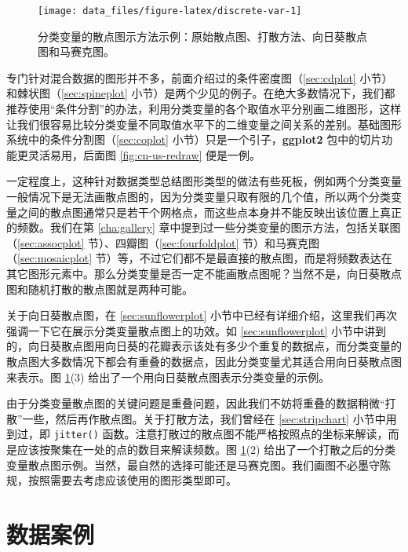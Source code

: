 \documentclass[
  b5paper,
  UTF8,twoside]{book}
\begin{document}
\begin{figure}

{\centering \texttt{[image: data\_files/figure-latex/discrete-var-1]} 

}

\caption[分类变量的散点图示方法示例]{分类变量的散点图示方法示例：原始散点图、打散方法、向日葵散点图和马赛克图。}\label{fig:discrete-var}
\end{figure}



专门针对混合数据的图形并不多，前面介绍过的条件密度图（\ref{sec:cdplot} 小节）和棘状图（\ref{sec:spineplot} 小节）是两个少见的例子。在绝大多数情况下，我们都推荐使用``条件分割''的办法，利用分类变量的各个取值水平分别画二维图形，这样让我们很容易比较分类变量不同取值水平下的二维变量之间关系的差别。基础图形系统中的条件分割图（\ref{sec:coplot} 小节）只是一个引子，\textbf{ggplot2} 包中的切片功能更灵活易用，后面图 \ref{fig:cn-us-redraw} 便是一例。

一定程度上，这种针对数据类型总结图形类型的做法有些死板，例如两个分类变量一般情况下是无法画散点图的，因为分类变量只取有限的几个值，所以两个分类变量之间的散点图通常只是若干个网格点，而这些点本身并不能反映出该位置上真正的频数。我们在第 \ref{cha:gallery} 章中提到过一些分类变量的图示方法，包括关联图（\ref{sec:assocplot} 节）、四瓣图（\ref{sec:fourfoldplot} 节）和马赛克图（\ref{sec:mosaicplot} 节）等，不过它们都不是最直接的散点图，而是将频数表达在其它图形元素中。那么分类变量是否一定不能画散点图呢？当然不是，向日葵散点图和随机打散的散点图就是两种可能。

关于向日葵散点图，在 \ref{sec:sunflowerplot} 小节中已经有详细介绍，这里我们再次强调一下它在展示分类变量散点图上的功效。如 \ref{sec:sunflowerplot} 小节中讲到的，向日葵散点图用向日葵的花瓣表示该处有多少个重复的数据点，而分类变量的散点图大多数情况下都会有重叠的数据点，因此分类变量尤其适合用向日葵散点图来表示。图 \ref{fig:discrete-var}(3) 给出了一个用向日葵散点图表示分类变量的示例。

由于分类变量散点图的关键问题是重叠问题，因此我们不妨将重叠的数据稍微``打散''一些，然后再作散点图。关于打散方法，我们曾经在 \ref{sec:stripchart} 小节中用到过，即 \texttt{jitter()} 函数。注意打散过的散点图不能严格按照点的坐标来解读，而是应该按聚集在一处的点的数目来解读频数。图 \ref{fig:discrete-var}(2) 给出了一个打散之后的分类变量散点图示例。当然，最自然的选择可能还是马赛克图。我们画图不必墨守陈规，按照需要去考虑应该使用的图形类型即可。

\hypertarget{ux6570ux636eux6848ux4f8b}{%
\section{数据案例}\label{ux6570ux636eux6848ux4f8b}}
\end{document}
